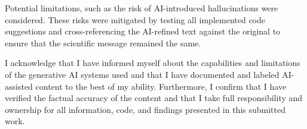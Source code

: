 Potential limitations, such as the risk of AI-introduced hallucinations were considered. These risks were mitigated by testing all implemented code suggestions and cross-referencing the AI-refined text against the original to ensure that the scientific message remained the same.

I acknowledge that I have informed myself about the capabilities and limitations of the generative AI systems used and that I have documented and labeled AI-assisted content to the best of my ability. Furthermore, I confirm that I have verified the factual accuracy of the content and that I take full responsibility and ownership for all information, code, and findings presented in this submitted work.